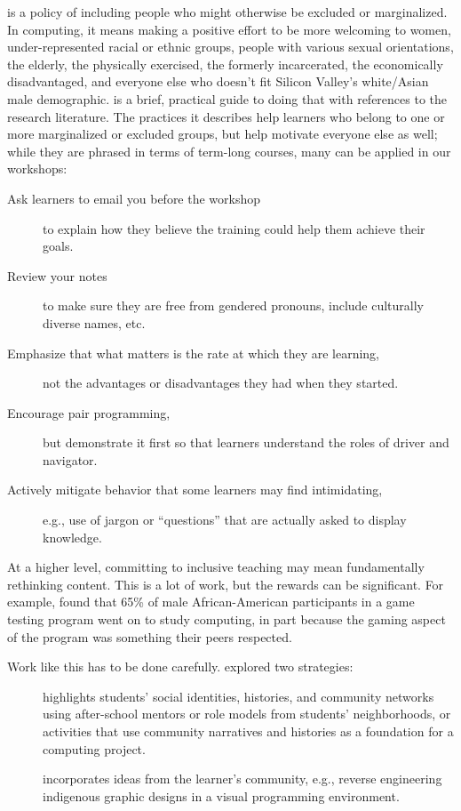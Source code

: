  is a policy of including people
who might otherwise be excluded or marginalized. In computing, it means
making a positive effort to be more welcoming to women,
under-represented racial or ethnic groups, people with various sexual
orientations, the elderly, the physically exercised, the formerly
incarcerated, the economically disadvantaged, and everyone else who
doesn't fit Silicon Valley's white/Asian male demographic.
\cite{Lee2017} is a brief, practical guide to doing that with
references to the research literature. The practices it describes help
learners who belong to one or more marginalized or excluded groups, but
help motivate everyone else as well; while they are phrased in terms of
term-long courses, many can be applied in our workshops:

\begin{description}
\item[Ask learners to email you before the workshop]
to explain how they believe the training could help them achieve
their goals.
\item[Review your notes]
to make sure they are free from gendered pronouns, include
culturally diverse names, etc.
\item[Emphasize that what matters is the rate at which they are learning,]
not the advantages or disadvantages they had when they started.
\item[Encourage pair programming,]
but demonstrate it first so that learners understand the roles
of driver and navigator.
\item[Actively mitigate behavior that some learners may find intimidating,]
e.g., use of jargon or ``questions'' that are actually asked to
display knowledge.
\end{description}

At a higher level, committing to inclusive teaching may mean
fundamentally rethinking content. This is a lot of work, but the rewards
can be significant. For example, \cite{DiSa2014a} found that 65\% of
male African-American participants in a game testing program went on to
study computing, in part because the gaming aspect of the program was
something their peers respected.

Work like this has to be done carefully. \cite{Lach2018} explored two
strategies:

\begin{description}
\item[{}]
highlights students' social identities, histories, and community
networks using after-school mentors or role models from students'
neighborhoods, or activities that use community narratives and
histories as a foundation for a computing project.
\item[{}]
incorporates ideas from the learner's community, e.g., reverse
engineering indigenous graphic designs in a visual programming
environment.
\end{description}

